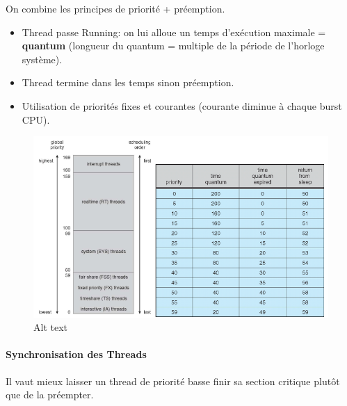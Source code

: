 On combine les principes de priorité + préemption.

\begin{itemize}
\tightlist
\item
  Thread passe Running: on lui alloue un temps d'exécution maximale =
  \textbf{quantum} (longueur du quantum = multiple de la période de
  l'horloge système).
\item
  Thread termine dans les temps sinon préemption.
\item
  Utilisation de priorités fixes et courantes (courante diminue à chaque
  burst CPU).
\end{itemize}

\begin{figure}
\centering
\includegraphics{image-33.png}
\caption{Alt text}
\end{figure}

\paragraph{Synchronisation des
Threads}\label{synchronisation-des-threads}

Il vaut mieux laisser un thread de priorité basse finir sa section
critique plutôt que de la préempter.

